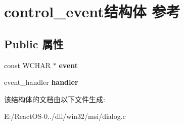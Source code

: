 \hypertarget{structcontrol__event}{}\section{control\+\_\+event结构体 参考}
\label{structcontrol__event}
\subsection*{Public 属性}
\begin{DoxyCompactItemize}
\item 
\mbox{\label{structcontrol__event_af3ddbb26e05b2f1fe1ee6dc5ac3ec21a}} 
const W\+C\+H\+AR $\ast$ {\bfseries event}
\item 
\mbox{\label{structcontrol__event_ad15571f5d4807b32e10e8eb93b2fe160}} 
event\+\_\+handler {\bfseries handler}
\end{DoxyCompactItemize}


该结构体的文档由以下文件生成\+:\begin{DoxyCompactItemize}
\item 
E\+:/\+React\+O\+S-\/0../dll/win32/msi/dialog.\+c\end{DoxyCompactItemize}
